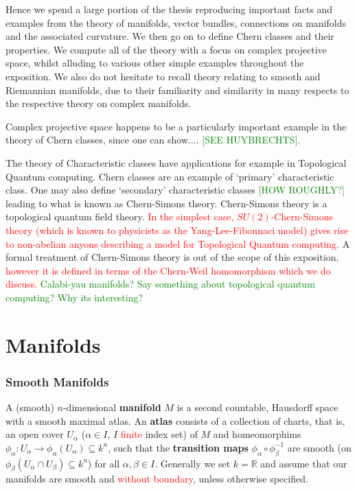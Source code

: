 \documentclass[a4paper]{article}
\theoremstyle{definition} \newtheorem*{definition}{Definition}
\theoremstyle{definition} \newtheorem*{definitions}{Definitions}
\theoremstyle{plain} \newtheorem{theorem}{Theorem}[section]
\theoremstyle{plain} \newtheorem{proposition}[theorem]{Proposition}
\theoremstyle{plain} \newtheorem{corollary}[theorem]{Corollary}
\theoremstyle{plain} \newtheorem{lemma}[theorem]{Lemma}
\theoremstyle{plain} \newtheorem{example}[theorem]{Example}
\newcommand{\checkCorrect}[1]{\textcolor{red}{#1}}
\newcommand{\finish}[1]{\textcolor{green}{#1}}
\newcommand{\defn}[1]{\textbf{#1}}
\newcommand{\realnos}{\mathbb{R}}
\begin{document}
Hence we spend a large portion of the thesis  reproducing important facts and examples from the theory of manifolds, vector bundles, connections on manifolds and the associated curvature. We then go on to define Chern classes and their properties. We compute all of the theory with a focus on complex projective space, whilst alluding to various other simple examples throughout the exposition. We also do not hesitate to recall theory relating to smooth and Riemannian manifolds, due to their familiarity and similarity in many respects to the respective theory on complex manifolds.

Complex projective space happens to be a particularly important example in the theory of Chern classes, since one can show.... \finish{[SEE HUYBRECHTS]}.

The theory of Characteristic classes have applications for example in Topological Quantum computing. Chern classes are an example of `primary' characteristic class. One may also define `secondary' characteristic classes \finish{[HOW ROUGHLY?]} leading to what is known as Chern-Simons theory. Chern-Simons theory is a topological quantum field theory. \checkCorrect{In the simplest case, $SU(2)$-Chern-Simons theory (which is known to physicists as the Yang-Lee-Fibonnaci model) gives rise to non-abelian anyons describing a model for Topological Quantum computing.} A formal treatment of Chern-Simons theory is out of the scope of this exposition, \checkCorrect{however it is defined in terms of the Chern-Weil homomorphism which we do discuss.} 
\finish{Calabi-yau manifolds?}
\finish{Say something about topological quantum computing? Why its interesting?}

\section{Manifolds}

\subsubsection{Smooth Manifolds}

A (smooth) $n$-dimensional \defn{manifold} $M$ is a second countable, Hausdorff space with a smooth maximal atlas. An \defn{atlas} consists of a collection of charts, that is, an open cover $U_\alpha$ ($\alpha\in I$, $I$ \checkCorrect{finite} index set) of $M$ and homeomorphims $\phi_\alpha:U_\alpha \to \phi_\alpha(U_\alpha) \subseteq k^n$, such that the \defn{transition maps} $\phi_\alpha \circ \phi_\beta^{-1}$ are smooth (on $\phi_\beta(U_\alpha \cap U_\beta)\subseteq k^n$) for all $\alpha, \beta\in I$. Generally we set $k=\realnos$ and assume that our manifolds are smooth and \checkCorrect{without boundary}, unless otherwise specified. 
\end{document}
